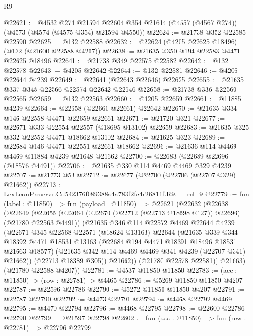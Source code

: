 \begin{lexlean}{R9}
\begin{coremodule}
@22621 := @4532
    @274
    @21594
    @22604
    @354
    @21614
    (@4557 (@4567 @274))
    (@4573 (@4574 (@4575 @354) @21594 @4550))
@22624 := @21738 @352 @22585 @22590
@22625 := @132 @22588
@22632 := @22624 (@4205 @22625 @18496) (@132 (@21600 @22588 @4207))
@22638 := @21635 @350 @194 @22583 @4471 @22625 @18496
@22641 := @21738 @349 @22575 @22582
@22642 := @132 @22578
@22643 := @4205 @22642
@22644 := @132 @22581
@22646 := @4205 @22644 @4239
@22649 := @22641 (@22643 @22646) @22625
@22655 := @21635 @337 @348 @22566 @22574 @22642 @22646
@22658 := @21738 @336 @22560 @22565
@22659 := @132 @22563
@22660 := @4205 @22659
@22661 := @11885 @4239
@22664 := @22658 (@22660 @22661) @22642
@22670 := @21635 @334 @146 @22558 @4471 @22659 @22661
@22671 := @21720 @321
@22677 := @22671 @333 @22554 @22557 (@18695 @13102) @22659
@22683 := @21635 @325 @332 @22552 @4471 @18662 @13102
@22684 := @21625 @323
@22689 := @22684 @146 @4471 @22551 @22661 @18662
@22696 := @21636 @114 @4469 @4469 @11884 @4239 @21648 @21662
@22700 := @22683 (@22689 @22696 (@18576 @4491))
@22706 := @21635 @330 @114 @4469 @4469 @329 @4239
@22707 := @21773 @53
@22712 := @22677 (@22700 (@22706 (@22707 @329) @21662))
@22713 := LexLeanPreserve.Cd542376f089388a4a783f2fc4c26811f.R9.__rel_9
@22779 := fun (label : @11850) =>
  fun (payload : @11850) =>
  @22621
    (@22632
      (@22638
        (@22649
          (@22655
            (@22664 (@22670 (@22712 (@22713 @18598 @127)) @22696) (@21780 @22563 @4491))
            (@21635
              @346
              @114
              @22572
              @4469
              @22644
              @4239
              (@22671
                @345
                @22568
                @22571
                (@18624 @13163)
                @22644
                (@21635
                  @339
                  @344
                  @18392
                  @4471
                  @18531
                  @13163
                  (@22684 @194 @4471 @18391 @18496 @18531 @21663 @18577)
                  (@21635 @342 @114 @4469 @4469 @341 @4239 (@22707 @341) @21662))
                (@22713 @18389 @305))
              @21662))
          (@21780 @22578 @22581))
        @21663)
      (@21780 @22588 @4207))
@22781 := @4537 @11850 @11850
@22783 := (acc : @11850) -> (row : @22781) -> @4465
@22786 := @5269 @11850 @11850 @4207
@22787 := @22596 @22786
@22790 := @5272 @11850 @11850 @4207
@22791 := @22787 @22790
@22792 := @4473 @22791
@22794 := @4468 @22792 @4469
@22795 := @4470 @22794
@22796 := @4468 @22795
@22798 := @22600 @22786 @22790
@22799 := @21597 @22798
@22802 := fun (acc : @11850) => fun (row : @22781) => @22796 @22799

\end{coremodule}
\end{lexlean}
